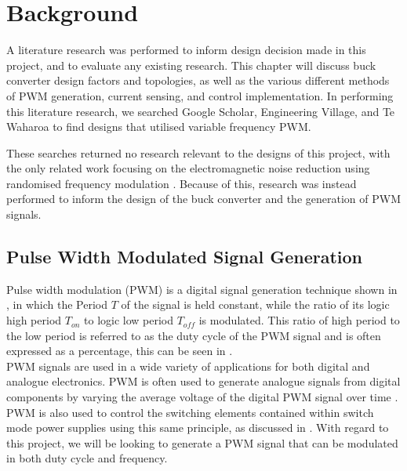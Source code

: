 \chapter{Background}\label{C:background}

A literature research was performed to inform design decision made in this project, and to evaluate any existing research. This chapter will discuss buck converter design factors and topologies, as well as the various different methods of PWM generation, current sensing, and control implementation. In performing this literature research, we searched Google Scholar, Engineering Village, and Te Waharoa to find designs that utilised variable frequency PWM. 

These searches returned no research relevant to the designs of this project, with the only related work focusing on the electromagnetic noise reduction using randomised frequency modulation \cite{Roman2001,Familiant2016}. Because of this, research was instead performed to inform the design of the buck converter and the generation of PWM signals.

\section{Pulse Width Modulated Signal Generation}\label{S:PWM_back}

Pulse width modulation (PWM) is a digital signal generation technique shown in , in which the Period $T$ of the signal is held constant, while the ratio of its logic high period $T_{on}$ to logic low period $T_{off}$ is modulated. This ratio of high period to the low period is referred to as the duty cycle of the PWM signal and is often expressed as a percentage, this can be seen in .\\

PWM signals are used in a wide variety of applications for both digital and analogue electronics. PWM is often used to generate analogue signals from digital components by varying the average voltage of the digital PWM signal over time \cite{Tareen2019}. PWM is also used to control the switching elements contained within switch mode power supplies using this same principle, as discussed in . With regard to this project, we will be looking to generate a PWM signal that can be modulated in both duty cycle and frequency.

